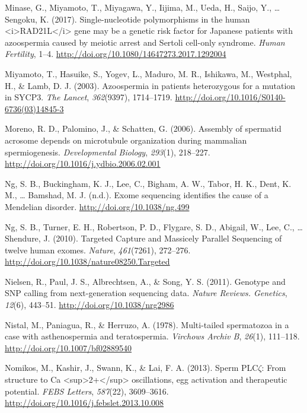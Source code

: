 \documentclass[12pt,twoside]{reedthesis}
\theoremstyle{definition}
\theoremstyle{definition}
\theoremstyle{remark}
\begin{document}
  \hypertarget{ref-Minase2017}{}
  Minase, G., Miyamoto, T., Miyagawa, Y., Iijima, M., Ueda, H., Saijo, Y.,
  \ldots{} Sengoku, K. (2017). Single-nucleotide polymorphisms in the
  human \textless{}i\textgreater{}RAD21L\textless{}/i\textgreater{} gene
  may be a genetic risk factor for Japanese patients with azoospermia
  caused by meiotic arrest and Sertoli cell-only syndrome. \emph{Human
  Fertility}, 1--4. \url{http://doi.org/10.1080/14647273.2017.1292004}
  
  \hypertarget{ref-Miyamoto2003}{}
  Miyamoto, T., Hasuike, S., Yogev, L., Maduro, M. R., Ishikawa, M.,
  Westphal, H., \& Lamb, D. J. (2003). Azoospermia in patients
  heterozygous for a mutation in SYCP3. \emph{The Lancet},
  \emph{362}(9397), 1714--1719.
  \url{http://doi.org/10.1016/S0140-6736(03)14845-3}
  
  \hypertarget{ref-Moreno2006}{}
  Moreno, R. D., Palomino, J., \& Schatten, G. (2006). Assembly of
  spermatid acrosome depends on microtubule organization during mammalian
  spermiogenesis. \emph{Developmental Biology}, \emph{293}(1), 218--227.
  \url{http://doi.org/10.1016/j.ydbio.2006.02.001}
  
  \hypertarget{ref-Ng}{}
  Ng, S. B., Buckingham, K. J., Lee, C., Bigham, A. W., Tabor, H. K.,
  Dent, K. M., \ldots{} Bamshad, M. J. (n.d.). Exome sequencing identifies
  the cause of a Mendelian disorder. \url{http://doi.org/10.1038/ng.499}
  
  \hypertarget{ref-Ng2010}{}
  Ng, S. B., Turner, E. H., Robertson, P. D., Flygare, S. D., Abigail, W.,
  Lee, C., \ldots{} Shendure, J. (2010). Targeted Capture and Massicely
  Parallel Sequencing of twelve human exomes. \emph{Nature},
  \emph{461}(7261), 272--276.
  \url{http://doi.org/10.1038/nature08250.Targeted}
  
  \hypertarget{ref-Nielsen2011}{}
  Nielsen, R., Paul, J. S., Albrechtsen, A., \& Song, Y. S. (2011).
  Genotype and SNP calling from next-generation sequencing data.
  \emph{Nature Reviews. Genetics}, \emph{12}(6), 443--51.
  \url{http://doi.org/10.1038/nrg2986}
  
  \hypertarget{ref-Nistal}{}
  Nistal, M., Paniagua, R., \& Herruzo, A. (1978). Multi-tailed
  spermatozoa in a case with asthenospermia and teratospermia.
  \emph{Virchows Archiv B}, \emph{26}(1), 111--118.
  \url{http://doi.org/10.1007/bf02889540}
  
  \hypertarget{ref-Nomikos2013}{}
  Nomikos, M., Kashir, J., Swann, K., \& Lai, F. A. (2013). Sperm
  PLC\(\zeta\): From structure to Ca
  \textless{}sup\textgreater{}2+\textless{}/sup\textgreater{}
  oscillations, egg activation and therapeutic potential. \emph{FEBS
  Letters}, \emph{587}(22), 3609--3616.
  \url{http://doi.org/10.1016/j.febslet.2013.10.008}
  
\end{document}
